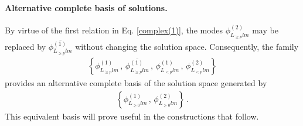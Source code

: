 \documentclass[aps,twocolumn,nofootinbib]{revtex4}
\begin{document}
\paragraph{Alternative complete basis of solutions.} By virtue of the first relation in Eq. \eqref{complex(1)}, the modes $\phi^{(2)}_{L_{\geqslant p}lm}$ may be replaced by $\overline{\phi^{(1)}_{L^{}_{\geqslant p}lm}}$ without changing the solution space. Consequently, the family
\begin{align}\label{50}
    \left\{ \phi^{(1)}_{L^{}_{\geqslant p}lm} \,,\, \overline{\phi^{(1)}_{L^{}_{\geqslant p}lm}} \,,\, \phi^{(1)}_{L^{}_{< p}lm} \,,\, \phi^{(2)}_{L^{}_{< p}lm} \right\}
\end{align}
provides an alternative complete basis of the solution space generated by
\begin{align}
    \left\{ \phi^{(1)}_{L^{}_{\geqslant 0}lm} \,,\, \phi^{(2)}_{L^{}_{\geqslant 0}lm} \right\} \,.
\end{align}
This equivalent basis will prove useful in the constructions that follow.
\end{document}
